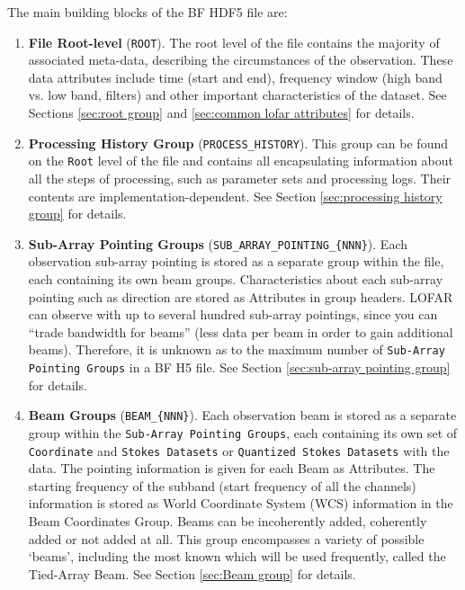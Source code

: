 \documentclass[a4paper,10pt,bibtotoc]{scrartcl}
\begin{document}
The main building blocks of the BF HDF5 file are:

\begin{enumerate} \parskip 0pt
\item \textbf{File Root-level} (\verb|ROOT|). The root level of the
  file contains the majority of associated meta-data, describing the
  circumstances of the observation. These data attributes include time
  (start and end), frequency window (high band vs. low band, filters)
  and other important characteristics of the dataset. See Sections
  \ref{sec:root group} and \ref{sec:common lofar attributes} for details.

\item \textbf{Processing History Group} (\verb|PROCESS_HISTORY|). This group can be found on the \texttt{Root} level of the file and contains all
  encapsulating information about all the steps of processing, such as
  parameter sets and processing logs. Their contents are implementation-dependent. See Section \ref{sec:processing history group} for details.

\item \textbf{Sub-Array Pointing Groups}
  (\verb|SUB_ARRAY_POINTING_{NNN}|). Each observation sub-array
  pointing is stored as a separate group within the file, each
  containing its own beam groups. Characteristics about each sub-array
  pointing such as direction are stored as Attributes in group
  headers.  LOFAR can observe with up to several hundred sub-array pointings,
  since you can ``trade bandwidth for beams'' (less data per beam in
  order to gain additional beams). Therefore, it is unknown as to the
  maximum number of \texttt{Sub-Array Pointing Groups} in a BF H5
  file.  See Section \ref{sec:sub-array pointing group} for details.

\item \textbf{Beam Groups} (\verb|BEAM_{NNN}|). Each observation beam is stored as a
  separate group within the \texttt{Sub-Array Pointing Groups}, each
  containing its own set of \texttt{Coordinate} and \texttt{Stokes
    Datasets} or \texttt{Quantized Stokes Datasets} with the data.
    The pointing information is given for each
  Beam as Attributes.  The starting frequency of the subband (start
  frequency of all the channels) information is stored as World
  Coordinate System (WCS) information in the Beam Coordinates Group.  Beams
  can be incoherently added, coherently added or not added at all.
  This group encompasses a variety of possible `beams', including the
  most known which will be used frequently, called the Tied-Array Beam.
  See Section \ref{sec:Beam group} for details.


\end{enumerate}
\end{document}
